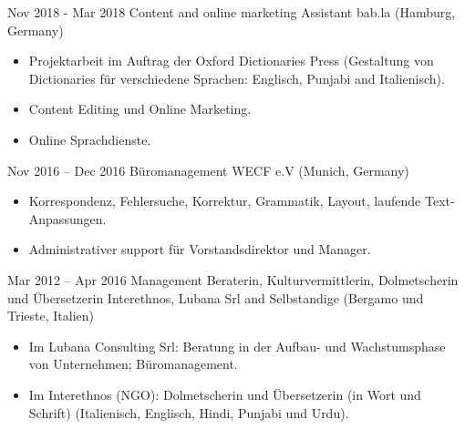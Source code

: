 \documentclass[a4paper,]{fortysecondscv}
\begin{document}
\makefrontsidebar



	\begin{cvtable}[4]

		\cvitem
			{Nov 2018 - Mar 2018}
			{Content and online marketing Assistant}
			{bab.la  (Hamburg, Germany)}
			{
				\vspace{-\topsep}
				\begin{itemize}[nosep, leftmargin=0pt] %
					\item Projektarbeit im Auftrag der Oxford Dictionaries Press (Gestaltung von Dictionaries für verschiedene Sprachen: Englisch, Punjabi and Italienisch). 
					\item Content Editing und Online Marketing.
					\item Online Sprachdienste.
				\end{itemize}
			}
		\cvitem
			{Nov 2016 -- Dec 2016}
			{Büromanagement}
			{WECF e.V (Munich, Germany)}
			{
				\vspace{-\topsep}
				\begin{itemize}[nosep, leftmargin=0pt] %
  					\item Korrespondenz, Fehlersuche, Korrektur, Grammatik, Layout, laufende Text-Anpassungen. 				  
  					\item Administrativer support für Vorstandsdirektor und Manager.
				\end{itemize}
			}
		\cvitem
			{Mar 2012 -- Apr 2016}
			{Management Beraterin, Kulturvermittlerin, Dolmetscherin und Übersetzerin}
			{Interethnos, Lubana Srl and Selbstandige (Bergamo und Trieste, Italien)}
			{				
				\vspace{-\topsep}
				\begin{itemize}[nosep, leftmargin=0pt] %
					\item Im Lubana Consulting Srl: Beratung in der Aufbau- und Wachstumsphase von Unternehmen; Büromanagement.
					\item Im Interethnos (NGO): Dolmetscherin und Übersetzerin (in Wort und Schrift) (Italienisch, Englisch, Hindi, Punjabi und Urdu).

\end{itemize}}
\end{cvtable}
\end{document}
